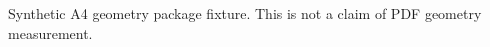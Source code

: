 \documentclass{article}
\begin{document}
Synthetic A4 geometry package fixture. This is not a claim of PDF geometry measurement.
\end{document}
